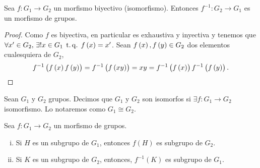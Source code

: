 \begin{prop}
    Sea $f \colon G_1 \to G_2$ un morfismo biyectivo (isomorfismo). Entonces
    $f^{-1} \colon G_2 \to G_1$ es un morfismo de grupos.
\end{prop}

\begin{proof}
    Como $f$ es biyectiva, en particular es exhaustiva y inyectiva y tenemos que $\forall x' \in G_2,\, \exists! x \in G_1 \operatorname{\;t.q.\;} f\left( x \right) = x'$. Sean $f\left( x\right), f\left( y\right) \in G_2$ dos elementos cualesquiera de $G_2$,
    \[
        f^{-1}\left( f\left( x\right) f\left( y\right) \right) = f^{-1} \left( f\left( xy\right) \right) = xy = f^{-1} \left( f\left( x\right) \right) f^{-1}\left( f\left( y\right) \right).
    \]
\end{proof}

\begin{defi}
    Sean $G_1$ y $G_2$ grupos. Decimos que $G_1$ y $G_2$ son isomorfos si $\exists f \colon G_1 \to G_2$
    isomorfismo. Lo notaremos como $G_1\cong G_2$.
\end{defi}

\begin{prop}
    Sea $f \colon G_1 \to G_2$ un morfismo de grupos.
    \begin{enumerate}[i)]
        \item Si $H$ es un subgrupo de $G_1$, entonces $f(H)$ es subgrupo de $G_2$.
        \item Si $K$ es un subgrupo de $G_2$, entonces, $f^{-1}(K)$ es subgrupo de $G_1$.
    \end{enumerate}
\end{prop}

